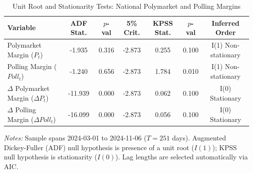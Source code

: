 \begin{table}[htbp]
\centering
\small
\caption{Unit Root and Stationarity Tests: National Polymarket and Polling Margins}
\label{tab:unit_root}
\begin{tabular}{lcccccc}
\hline\hline
Variable & ADF Stat. & $p$-val & 5\% Crit. & KPSS Stat. & $p$-val & Inferred Order \\
\hline
Polymarket Margin ($P_t$) & -1.935 & 0.316 & -2.873 & 0.255 & 0.100 & I(1) Non-stationary \\
Polling Margin ($Poll_t$) & -1.240 & 0.656 & -2.873 & 1.784 & 0.010 & I(1) Non-stationary \\
$\Delta$ Polymarket Margin ($\Delta P_t$) & -11.939 & 0.000 & -2.873 & 0.062 & 0.100 & I(0) Stationary \\
$\Delta$ Polling Margin ($\Delta Poll_t$) & -16.099 & 0.000 & -2.873 & 0.056 & 0.100 & I(0) Stationary \\
\hline\hline
\end{tabular}
\begin{minipage}{0.95\textwidth}
\vspace{1ex}
\footnotesize
\textit{Notes:} Sample spans 2024-03-01 to 2024-11-06 ($T=251$ days). Augmented Dickey-Fuller (ADF) null hypothesis is presence of a unit root ($I(1)$); KPSS null hypothesis is stationarity ($I(0)$). Lag lengths are selected automatically via AIC.
\end{minipage}
\end{table}

